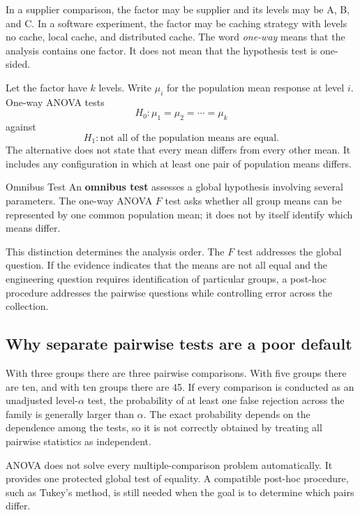 In a supplier comparison, the factor may be supplier and its levels may be A, B, and C. In a software experiment, the factor may be caching strategy with levels no cache, local cache, and distributed cache. The word \emph{one-way} means that the analysis contains one factor. It does not mean that the hypothesis test is one-sided.

Let the factor have $k$ levels. Write $\mu_i$ for the population mean response at level $i$. One-way ANOVA tests
\[
H_0:\mu_1=\mu_2=\cdots=\mu_k
\]
against
\[
H_1:\text{not all of the population means are equal}.
\]
The alternative does not state that every mean differs from every other mean. It includes any configuration in which at least one pair of population means differs.

\begin{definition}{Omnibus Test}
An \textbf{omnibus test} assesses a global hypothesis involving several parameters. The one-way ANOVA $F$ test asks whether all group means can be represented by one common population mean; it does not by itself identify which means differ.
\end{definition}

This distinction determines the analysis order. The $F$ test addresses the global question. If the evidence indicates that the means are not all equal and the engineering question requires identification of particular groups, a post-hoc procedure addresses the pairwise questions while controlling error across the collection.

\subsection{Why separate pairwise tests are a poor default}

With three groups there are three pairwise comparisons. With five groups there are ten, and with ten groups there are 45. If every comparison is conducted as an unadjusted level-$\alpha$ test, the probability of at least one false rejection across the family is generally larger than $\alpha$. The exact probability depends on the dependence among the tests, so it is not correctly obtained by treating all pairwise statistics as independent.

ANOVA does not solve every multiple-comparison problem automatically. It provides one protected global test of equality. A compatible post-hoc procedure, such as Tukey's method, is still needed when the goal is to determine which pairs differ.

